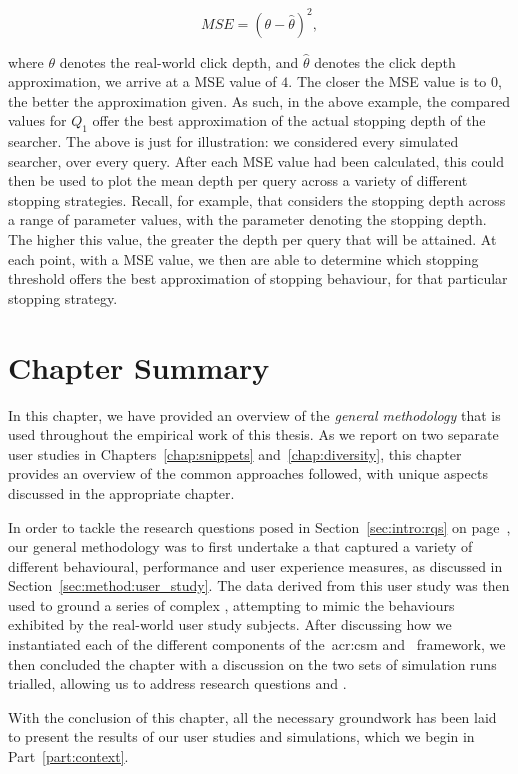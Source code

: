 \begin{equation*}
MSE = (\theta - \hat{\theta})^{2},
\end{equation*}

where $\theta$ denotes the real-world click depth, and $\hat{\theta}$ denotes the click depth approximation, we arrive at a MSE value of $4$. The closer the MSE value is to $0$, the better the approximation given. As such, in the above example, the compared values for $Q_1$ offer the best approximation of the actual stopping depth of the searcher. The above is just for illustration: we considered every simulated searcher, over every query. After each MSE value had been calculated, this could then be used to plot the mean depth per query across a variety of different stopping strategies. Recall, for example, that  considers the stopping depth across a range of parameter values, with the parameter denoting the stopping depth. The higher this value, the greater the depth per query that will be attained. At each point, with a MSE value, we then are able to determine which stopping threshold offers the best approximation of stopping behaviour, for that particular stopping strategy.

\section{Chapter Summary}
In this chapter, we have provided an overview of the \emph{general methodology} that is used throughout the empirical work of this thesis. As we report on two separate user studies in Chapters~\ref{chap:snippets} and~\ref{chap:diversity}, this chapter provides an overview of the common approaches followed, with unique aspects discussed in the appropriate chapter.

In order to tackle the research questions posed in Section~\ref{sec:intro:rqs} on page~\pageref{sec:intro:rqs}, our general methodology was to first undertake a  that captured a variety of different behavioural, performance and user experience measures, as discussed in Section~\ref{sec:method:user_study}. The data derived from this user study was then used to ground a series of complex , attempting to mimic the behaviours exhibited by the real-world user study subjects. After discussing how we instantiated each of the different components of the~\gls{acr:csm} and \simiir~framework, we then concluded the chapter with a discussion on the two sets of simulation runs trialled, allowing us to address research questions  and .

With the conclusion of this chapter, all the necessary groundwork has been laid to present the results of our user studies and simulations, which we begin in Part~\ref{part:context}.
